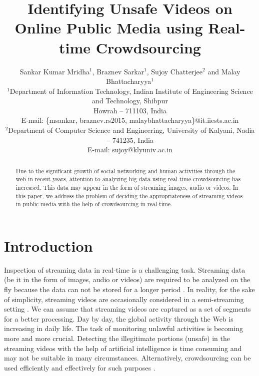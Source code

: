 \documentclass[letterpaper]{article}
\begin{document}
%
\title{Identifying Unsafe Videos on Online Public Media using Real-time Crowdsourcing}
\author{Sankar Kumar Mridha$^1$, Braznev Sarkar$^1$, Sujoy Chatterjee$^2$ and Malay Bhattacharyya$^1$\\
$^1$Department of Information Technology, Indian Institute of Engineering Science and Technology, Shibpur\\ Howrah -- 711103, India\\
E-mail: \{msankar, braznev.rs2015, malaybhattacharyya\}@it.iiests.ac.in\\
$^2$Department of Computer Science and Engineering, University of Kalyani, Nadia -- 741235, India\\
E-mail: sujoy@klyuniv.ac.in\\
}
\maketitle




\begin{abstract}
Due to the significant growth of social networking and human activities through the web in recent years, attention to analyzing big data using real-time crowdsourcing has increased. This data may appear in the form of streaming images, audio or videos. In this paper, we address the problem of deciding the appropriateness of streaming videos in public media with the help of crowdsourcing in real-time.
\end{abstract}




\section{Introduction}
Inspection of streaming data in real-time is a challenging task. Streaming data (be it in the form of images, audio or videos) are required to be analyzed on the fly because the data can not be stored for a longer period \cite{Muthukrishnan2005}. In reality, for the sake of simplicity, streaming videos are occasionally considered in a semi-streaming setting \cite{Galasso2014}. We can assume that streaming videos are captured as a set of segments for a better processing. Day by day, the global activity through the Web is increasing in daily life. The task of monitoring unlawful activities is becoming more and more crucial. Detecting the illegitimate portions (unsafe) in the streaming videos with the help of artificial intelligence is time consuming and may not be suitable in many circumstances. Alternatively, crowdsourcing can be used efficiently and effectively for such purposes \cite{Yeung1998}.
\end{document}
